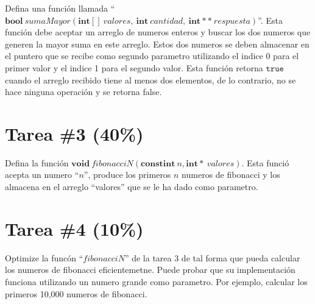 \documentclass{article}
\begin{document}
Defina una funci\'on llamada ``$\mathbf{bool}\ sumaMayor(\mathbf{int[]}\ valores,\ \mathbf{int}\ cantidad,\ \mathbf{int**}\ respuesta)$''. Esta funci\'on debe aceptar un arreglo de numeros enteros
y buscar los dos numeros que generen la mayor suma en este arreglo. Estos dos numeros se deben almacenar en el
puntero que se recibe como segundo parametro utilizando el indice 0 para el primer valor y el indice 1 para el segundo valor.
Esta funci\'on retorna $\mathtt{true}$ cuando el arreglo recibido tiene al menos dos elementos, de lo contrario,
no se hace ninguna operaci\'on y se retorna false.

\section*{Tarea \#3 (40\%)}

Defina la funci\'on $\mathbf{void}\ fibonacciN(\mathbf{const int}\ n,\mathbf{int*}\ valores)$. Esta funci\'o
acepta un numero ``$n$'', produce los primeros $n$ numeros de fibonacci y los almacena en el arreglo
``valores'' que se le ha dado como parametro.

\section*{Tarea \#4 (10\%)}

Optimize la func\'on ``$fibonacciN$'' de la tarea 3 de tal forma que pueda calcular los numeros de
fibonacci eficientemetne. Puede probar que su implementaci\'on funciona utilizando un numero
grande como parametro. Por ejemplo, calcular los primeros 10,000 numeros de fibonacci.
\end{document}
